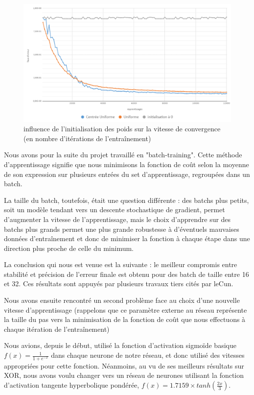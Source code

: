 \documentclass[
    10pt,
    a4paper,
    oneside,
    headinclude,footinclude,
    BCOR=5mm,
    captions=tableabove
]{scrartcl}
\begin{document}
\begin{figure}[h!]
\includegraphics[width=\linewidth]{initPoids.png}
\centering
 \caption{influence de l'initialisation des poids sur la vitesse de convergence (en nombre d'itérations de l'entraînement) }
 \label{fig:initPoids.png}
\end{figure}

Nous avons pour la suite du projet travaillé en "batch-training". Cette méthode d'apprentissage signifie que nous minimisons la fonction de coût selon la moyenne de son expression sur plusieurs entrées du set d'apprentissage, regroupées dans un batch.

La taille du batch, toutefois, était une question différente : des batchs plus petits, soit un modèle tendant vers un descente stochastique de gradient, permet d'augmenter la vitesse de l'apprentissage, mais le choix d'apprendre sur des batchs plus grands permet une plus grande robustesse à d'éventuels mauvaises données d'entraînement et donc de minimiser la fonction à chaque étape dans une direction plus proche de celle du minimum.

La conclusion qui nous est venue est la suivante : le meilleur compromis entre stabilité et précision de l'erreur finale est obtenu pour des batch de taille entre 16 et 32. Ces résultats sont appuyés par plusieurs travaux tiers cités par leCun. %
\vspace{5mm}

Nous avons ensuite rencontré un second problème face au choix d'une nouvelle vitesse d'apprentissage (rappelons que ce paramètre externe au réseau représente la taille du pas vers la minimisation de la fonction de coût que nous effectuons à chaque itération de l'entraînement)

Nous avions, depuis le début, utilisé la fonction d'activation sigmoïde basique $f(x) = \frac{1}{1 + e^{-x}}$ dans chaque neurone de notre réseau, et donc utilisé des vitesses appropriées pour cette fonction.
Néanmoins, au vu de ses meilleurs résultats sur XOR, nous avons voulu changer vers un réseau de neurones utilisant  la fonction d'activation tangente hyperbolique pondérée, $f(x) = 1.7159 \times tanh(\frac{2x}{3})$.
\end{document}
